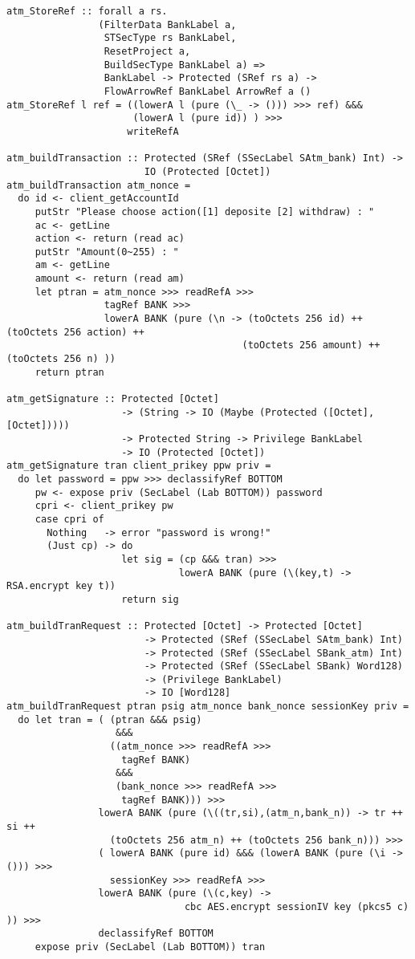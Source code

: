 \begin{Verbatim}[fontsize=\footnotesize,frame=lines,
                 framesep=5mm, label={[BankSystem.hs]BankSystem.hs}]
atm_StoreRef :: forall a rs. 
                (FilterData BankLabel a,
                 STSecType rs BankLabel,
                 ResetProject a,
                 BuildSecType BankLabel a) => 
                 BankLabel -> Protected (SRef rs a) -> 
                 FlowArrowRef BankLabel ArrowRef a ()
atm_StoreRef l ref = ((lowerA l (pure (\_ -> ())) >>> ref) &&& 
                      (lowerA l (pure id)) ) >>>
                     writeRefA 
     
atm_buildTransaction :: Protected (SRef (SSecLabel SAtm_bank) Int) -> 
                        IO (Protected [Octet])
atm_buildTransaction atm_nonce = 
  do id <- client_getAccountId
     putStr "Please choose action([1] deposite [2] withdraw) : "
     ac <- getLine
     action <- return (read ac)
     putStr "Amount(0~255) : "
     am <- getLine
     amount <- return (read am)
     let ptran = atm_nonce >>> readRefA >>> 
                 tagRef BANK >>> 
                 lowerA BANK (pure (\n -> (toOctets 256 id) ++ (toOctets 256 action) ++
                                         (toOctets 256 amount) ++ (toOctets 256 n) ))
     return ptran

atm_getSignature :: Protected [Octet] 
                    -> (String -> IO (Maybe (Protected ([Octet],[Octet]))))
                    -> Protected String -> Privilege BankLabel
                    -> IO (Protected [Octet])
atm_getSignature tran client_prikey ppw priv =
  do let password = ppw >>> declassifyRef BOTTOM
     pw <- expose priv (SecLabel (Lab BOTTOM)) password
     cpri <- client_prikey pw
     case cpri of
       Nothing   -> error "password is wrong!"
       (Just cp) -> do
                    let sig = (cp &&& tran) >>>
                              lowerA BANK (pure (\(key,t) -> RSA.encrypt key t))
                    return sig

atm_buildTranRequest :: Protected [Octet] -> Protected [Octet] 
                        -> Protected (SRef (SSecLabel SAtm_bank) Int) 
                        -> Protected (SRef (SSecLabel SBank_atm) Int) 
                        -> Protected (SRef (SSecLabel SBank) Word128) 
                        -> (Privilege BankLabel)
                        -> IO [Word128]
atm_buildTranRequest ptran psig atm_nonce bank_nonce sessionKey priv =
  do let tran = ( (ptran &&& psig) 
                   &&& 
                  ((atm_nonce >>> readRefA >>> 
                    tagRef BANK) 
                   &&& 
                   (bank_nonce >>> readRefA >>> 
                    tagRef BANK))) >>>
                lowerA BANK (pure (\((tr,si),(atm_n,bank_n)) -> tr ++ si ++ 
                  (toOctets 256 atm_n) ++ (toOctets 256 bank_n))) >>>
                ( lowerA BANK (pure id) &&& (lowerA BANK (pure (\i -> ())) >>> 
                  sessionKey >>> readRefA >>>
                lowerA BANK (pure (\(c,key) -> 
                               cbc AES.encrypt sessionIV key (pkcs5 c) )) >>>
                declassifyRef BOTTOM
     expose priv (SecLabel (Lab BOTTOM)) tran 
     

\end{Verbatim}
